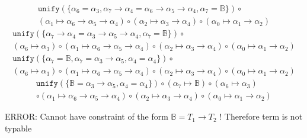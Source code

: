 \documentclass[11pt]{article}
\newcommand{\B}{\mathbb{B}}
\newcommand{\U}{\texttt{unify}}
\newcommand{\rarr}{\rightarrow}
\begin{document}
\begin{enumerate}
	\begin{multline}
		\U( \{ \alpha_6 = \alpha_3, \alpha_7 \rarr \alpha_4 = \alpha_6 \rarr \alpha_5 \rarr \alpha_4, \alpha_7 = \B \} ) \circ \\ ( \alpha_1 \mapsto \alpha_6 \rarr \alpha_5 \rarr \alpha_4) \circ ( \alpha_2 \mapsto \alpha_3 \rarr \alpha_4) \circ ( \alpha_0 \mapsto \alpha_1 \rarr \alpha_2) 
	\end{multline}
	\begin{multline}
		\U( \{ \alpha_7 \rarr \alpha_4 = \alpha_3 \rarr \alpha_5 \rarr \alpha_4, \alpha_7 = \B \}  ) \circ \\
		( \alpha_6 \mapsto \alpha_3) \circ  ( \alpha_1 \mapsto \alpha_6 \rarr \alpha_5 \rarr \alpha_4) \circ ( \alpha_2 \mapsto \alpha_3 \rarr \alpha_4) \circ ( \alpha_0 \mapsto \alpha_1 \rarr \alpha_2) 
	\end{multline}
	\begin{multline}
		\U( \{ \alpha_7 = \B, \alpha_7 = \alpha_3 \rarr \alpha_5, \alpha_4 = \alpha_4 \} ) \circ \\ 
			( \alpha_6 \mapsto \alpha_3) \circ  ( \alpha_1 \mapsto \alpha_6 \rarr \alpha_5 \rarr \alpha_4) \circ ( \alpha_2 \mapsto \alpha_3 \rarr \alpha_4) \circ ( \alpha_0 \mapsto \alpha_1 \rarr \alpha_2) 
	\end{multline}
	\begin{multline}
		\U( \{ \B = \alpha_3 \rarr \alpha_5, \alpha_4 = \alpha_4 \} ) \circ ( \alpha_7 \mapsto \B) \circ ( \alpha_6 \mapsto \alpha_3) \\
			\circ  ( \alpha_1 \mapsto \alpha_6 \rarr \alpha_5 \rarr \alpha_4) \circ ( \alpha_2 \mapsto \alpha_3 \rarr \alpha_4) \circ ( \alpha_0 \mapsto \alpha_1 \rarr \alpha_2) 
	\end{multline}

	\color{red}
	ERROR: Cannot have constraint of the form $\B = T_1 \rarr T_2$ ! Therefore term is not typable 

\end{enumerate}
\end{document}
